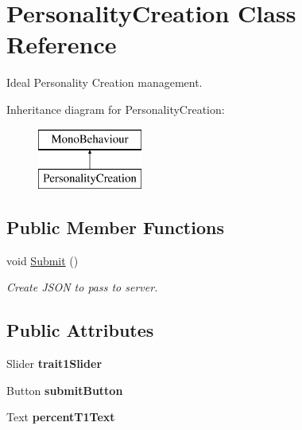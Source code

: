 \hypertarget{class_personality_creation}{}\section{Personality\+Creation Class Reference}
\label{class_personality_creation}


Ideal Personality Creation management.  


Inheritance diagram for Personality\+Creation\+:\begin{figure}[H]
\begin{center}
\leavevmode
\includegraphics[height=2.000000cm]{class_personality_creation}
\end{center}
\end{figure}
\subsection*{Public Member Functions}
\begin{DoxyCompactItemize}
\item 
\mbox{\label{class_personality_creation_a464be274e82be75bab0899f8756c9562}} 
void \mbox{\hyperlink{class_personality_creation_a464be274e82be75bab0899f8756c9562}{Submit}} ()
\begin{DoxyCompactList}\small\item\em Create J\+S\+ON to pass to server. \end{DoxyCompactList}\end{DoxyCompactItemize}
\subsection*{Public Attributes}
\begin{DoxyCompactItemize}
\item 
\mbox{\label{class_personality_creation_aa951821515495d458db8fc1b4a83ea4f}} 
Slider {\bfseries trait1\+Slider}
\item 
\mbox{\label{class_personality_creation_a4b841ca4b3004940300135d79365beac}} 
Button {\bfseries submit\+Button}
\item 
\mbox{\label{class_personality_creation_ac4714076ddafa535821be12ec0669692}} 
Text {\bfseries percent\+T1\+Text}
\end{DoxyCompactItemize}
